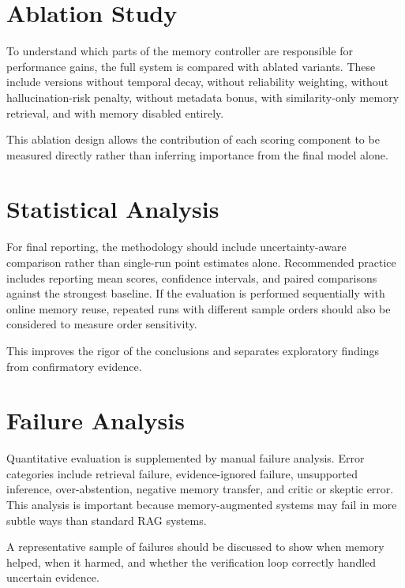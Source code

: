 \section{Ablation Study}
\label{sec:ablation-study}

To understand which parts of the memory controller are responsible for performance gains, the full system is compared with ablated variants. These include versions without temporal decay, without reliability weighting, without hallucination-risk penalty, without metadata bonus, with similarity-only memory retrieval, and with memory disabled entirely.

This ablation design allows the contribution of each scoring component to be measured directly rather than inferring importance from the final model alone.


\section{Statistical Analysis}
\label{sec:statistical-analysis}

For final reporting, the methodology should include uncertainty-aware comparison rather than single-run point estimates alone. Recommended practice includes reporting mean scores, confidence intervals, and paired comparisons against the strongest baseline. If the evaluation is performed sequentially with online memory reuse, repeated runs with different sample orders should also be considered to measure order sensitivity.

This improves the rigor of the conclusions and separates exploratory findings from confirmatory evidence.


\section{Failure Analysis}
\label{sec:failure-analysis}

Quantitative evaluation is supplemented by manual failure analysis. Error categories include retrieval failure, evidence-ignored failure, unsupported inference, over-abstention, negative memory transfer, and critic or skeptic error. This analysis is important because memory-augmented systems may fail in more subtle ways than standard RAG systems.

A representative sample of failures should be discussed to show when memory helped, when it harmed, and whether the verification loop correctly handled uncertain evidence.

